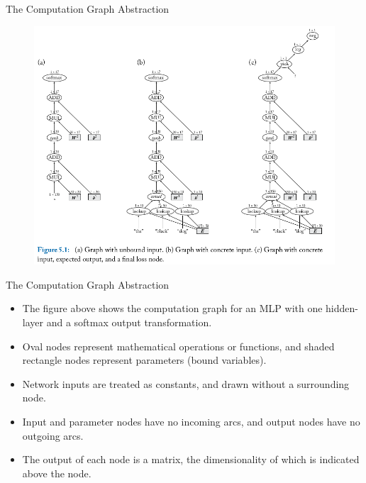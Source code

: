 \documentclass[handout]{beamer}
\begin{document}
\begin{frame}{The Computation Graph Abstraction}
\begin{scriptsize}

\begin{figure}[htb]
	\centering
	 \includegraphics[scale=0.32]{pics/comgraphexample.png}
\end{figure}


\end{scriptsize}
\end{frame}


\begin{frame}{The Computation Graph Abstraction}
\begin{scriptsize}
\begin{itemize}

\item The figure above shows the computation graph for an MLP with one hidden-layer and a softmax output transformation.


\item Oval nodes represent mathematical operations or functions, and shaded rectangle nodes represent parameters (bound variables).

\item Network inputs are treated as constants, and drawn without a surrounding node. 

\item Input and parameter nodes have no incoming arcs, and output nodes have no outgoing arcs. 

\item The output of each node is a matrix, the dimensionality of which is indicated above the node.


\end{itemize}
\end{scriptsize}
\end{frame}
\end{document}
